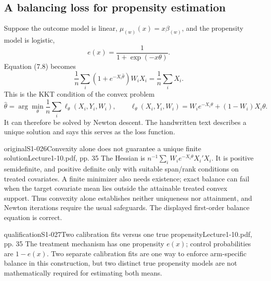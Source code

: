 \subsection{A balancing loss for propensity estimation}
Suppose the outcome model is linear, $\mu_{(w)}(x)=x\beta_{(w)}$, and the propensity model is logistic,
\[
e(x)=\frac1{1+\exp(-x\theta)}.
\]
 Equation (7.8) becomes
\[
\frac1n\sum_i(1+e^{-X_i\widehat\theta})W_iX_i=\frac1n\sum_iX_i.
\tag{7.9 in the notes}
\]
This is the KKT condition of the convex problem
\[
\widehat\theta=\arg\min_\theta\frac1n\sum_i\ell_\theta(X_i,Y_i,W_i),\qquad
\ell_\theta(X_i,Y_i,W_i)=W_ie^{-X_i\theta}+(1-W_i)X_i\theta.
\tag{7.10 in the notes}
\]
It can therefore be solved by Newton descent.
 The handwritten text describes a unique solution and says this serves as the loss function.
\begin{reviewnote}{original}{S1-026}{Convexity alone does not guarantee a unique finite solution}{Lecture1-10.pdf, pp. 35}
The Hessian is $n^{-1}\sum_iW_i e^{-X_i\theta}X_i'X_i$. It is positive semidefinite, and positive definite only with suitable span/rank conditions on treated covariates. A finite minimizer also needs existence; exact balance can fail when the target covariate mean lies outside the attainable treated convex support. Thus convexity alone establishes neither uniqueness nor attainment, and Newton iterations require the usual safeguards. The displayed first-order balance equation is correct.
\end{reviewnote}
\begin{reviewnote}{qualification}{S1-027}{Two calibration fits versus one true propensity}{Lecture1-10.pdf, pp. 35}
The treatment mechanism has one propensity $e(x)$; control probabilities are $1-e(x)$. Two separate calibration fits are one way to enforce arm-specific balance in this construction, but two distinct true propensity models are not mathematically required for estimating both means.
\end{reviewnote}

